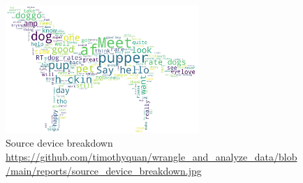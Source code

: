 \documentclass[10pt,a4paper]{article}
\begin{document}
        \begin{figure}[htb]
            \centering
            \includegraphics[width=0.65\textwidth]{dogcloud.jpg}      
            \caption{Source device breakdown \\\url{https://github.com/timothyquan/wrangle_and_analyze_data/blob/main/reports/source_device_breakdown.jpg} }            
        \end{figure}
\end{document}
